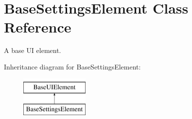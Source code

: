 \hypertarget{class_base_settings_element}{}\section{Base\+Settings\+Element Class Reference}
\label{class_base_settings_element}


A base UI element.  


Inheritance diagram for Base\+Settings\+Element\+:\begin{figure}[H]
\begin{center}
\leavevmode
\includegraphics[height=2.000000cm]{class_base_settings_element}
\end{center}
\end{figure}
